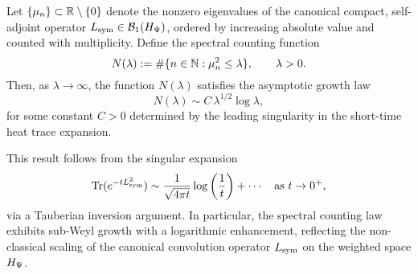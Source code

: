 \begin{proposition}
\label{prop:spectral_counting_weyl}
Let \( \{ \mu_n \} \subset \mathbb{R} \setminus \{0\} \) denote the nonzero eigenvalues of the canonical compact, self-adjoint operator \( L_{\mathrm{sym}} \in \mathcal{B}_1(H_{\Psi}) \), ordered by increasing absolute value and counted with multiplicity. Define the spectral counting function
\[
N(\lambda) := \#\{ n \in \mathbb{N} : \mu_n^2 \leq \lambda \}, \qquad \lambda > 0.
\]
Then, as \( \lambda \to \infty \), the function \( N(\lambda) \) satisfies the asymptotic growth law
\[
N(\lambda) \sim C\, \lambda^{1/2} \log \lambda,
\]
for some constant \( C > 0 \) determined by the leading singularity in the short-time heat trace expansion.

\medskip
\noindent
This result follows from the singular expansion
\[
\operatorname{Tr}(e^{-t L_{\mathrm{sym}}^2}) \sim \frac{1}{\sqrt{4\pi t}} \log\left( \frac{1}{t} \right) + \cdots \quad \text{as } t \to 0^+,
\]
via a Tauberian inversion argument. In particular, the spectral counting law exhibits sub-Weyl growth with a logarithmic enhancement, reflecting the non-classical scaling of the canonical convolution operator \( L_{\mathrm{sym}} \) on the weighted space \( H_{\Psi} \).
\end{proposition}
